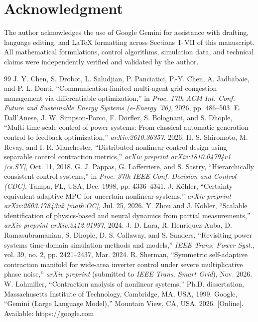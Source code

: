 \documentclass[journal]{IEEEtran}
\begin{document}
\section*{Acknowledgment}
The author acknowledges the use of Google Gemini \cite{gemini26} for assistance with drafting, language editing, and LaTeX formatting across Sections~I--VII of this manuscript. All mathematical formulations, control algorithms, simulation data, and technical claims were independently verified and validated by the author.

\begin{thebibliography}{99}
 J. Y. Chen, S. Drobot, L. Saludjian, P. Panciatici, P.-Y. Chen, A. Jadbabaie, and P. L. Donti, ``Communication-limited multi-agent grid congestion management via differentiable optimization,'' in \textit{Proc. 17th ACM Int. Conf. Future and Sustainable Energy Systems (e-Energy '26)}, 2026, pp. 486--503.
 E. Dall'Anese, J. W. Simpson-Porco, F. D\"orfler, S. Bolognani, and S. Dhople, ``Multi-time-scale control of power systems: From classical automatic generation control to feedback optimization,'' \textit{arXiv:2610.36357}, 2026.
 H. S. Shiromoto, M. Revay, and I. R. Manchester, ``Distributed nonlinear control design using separable control contraction metrics,'' \textit{arXiv preprint arXiv:1810.04794v1 [cs.SY]}, Oct. 11, 2018.
 G. J. Pappas, G. Lafferriere, and S. Sastry, ``Hierarchically consistent control systems,'' in \textit{Proc. 37th IEEE Conf. Decision and Control (CDC)}, Tampa, FL, USA, Dec. 1998, pp. 4336--4341.
 J. K\"ohler, ``Certainty-equivalent adaptive MPC for uncertain nonlinear systems,'' \textit{arXiv preprint arXiv:2603.17843v2 [math.OC]}, Jul. 25, 2026.
 Y. Zhou and J. K\"ohler, ``Scalable identification of physics-based and neural dynamics from partial measurements,'' \textit{arXiv preprint arXiv:2412.01997}, 2024.
 J. D. Lara, R. Henriquez-Auba, D. Ramasubramanian, S. Dhople, D. S. Callaway, and S. Sanders, ``Revisiting power systems time-domain simulation methods and models,'' \textit{IEEE Trans. Power Syst.}, vol. 39, no. 2, pp. 2421--2437, Mar. 2024.
 R. Sherman, ``Symmetric self-adaptive contraction manifold for wide-area inverter control under severe multiplicative phase noise,'' \textit{arXiv preprint} (submitted to \textit{IEEE Trans. Smart Grid}), Nov. 2026.
 W. Lohmiller, ``Contraction analysis of nonlinear systems,'' Ph.D. dissertation, Massachusetts Institute of Technology, Cambridge, MA, USA, 1999.
 Google, ``Gemini (Large Language Model),'' Mountain View, CA, USA, 2026. [Online]. Available: https://google.com
\end{thebibliography}
\end{document}
